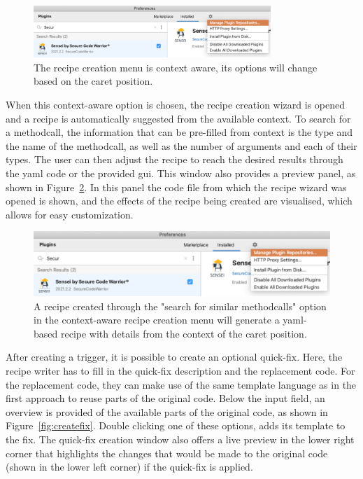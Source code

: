\begin{figure}[t]
  \centering
  \includegraphics[width=0.8\textwidth,page=11]{04-tools/figures/figures2.pdf}
  \caption[Context-aware recipe creation menu]{The recipe creation menu is context aware, its options will change based on the caret position.}
  \label{fig:newrecipemethodcall} 
\end{figure}

When this context-aware option is chosen, the recipe creation wizard is opened and a recipe is automatically suggested from the available context.
To search for a methodcall, the information that can be pre-filled from context is the type and the name of the methodcall, as well as the number of arguments and each of their types.
The user can then adjust the recipe to reach the desired results through the \gls{yaml} code or the provided \gls{gui}.
This window also provides a preview panel, as shown in Figure~\ref{fig:recipewizard1}.
In this panel the code file from which the recipe wizard was opened is shown, and the effects of the recipe being created are visualised, which allows for easy customization.

\begin{figure}
  \centering
  \includegraphics[width=\textwidth,page=10]{04-tools/figures/figures2.pdf}
  \caption[Recipe created from context]{A recipe created through the "search for similar methodcalls" option in the context-aware recipe creation menu will generate a \gls{yaml}-based recipe with details from the context of the caret position.}
  \label{fig:recipewizard1} 
\end{figure}

After creating a trigger, it is possible to create an optional quick-fix.
Here, the recipe writer has to fill in the quick-fix description and the replacement code.
For the replacement code, they can make use of the same template language as in the first approach to reuse parts of the original code.
Below the input field, an overview is provided of the available parts of the original code, as shown in Figure~\ref{fig:createfix}.
Double clicking one of these options, adds its template to the fix.
The quick-fix creation window also offers a live preview in the lower right corner that highlights the changes that would be made to the original code (shown in the lower left corner) if the quick-fix is applied.

